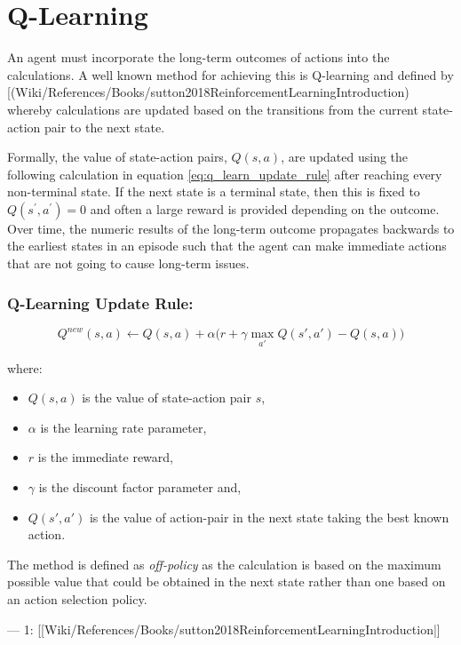 \documentclass{article}
\title{}
\author{Philip Osborne}
\begin{document}
\maketitle
\section{Q-Learning}
\label{loc:q:learning}
An agent must incorporate the long-term outcomes of actions into the calculations. A well known method for achieving this is Q-learning and defined by \cite{sutton2018ReinforcementLearningIntroduction} [\cite{sutton2018ReinforcementLearningIntroduction}(Wiki/References/Books/sutton2018ReinforcementLearningIntroduction) whereby calculations are updated based on the transitions from the current state-action pair to the next state.

Formally, the value of state-action pairs, $Q(s,a)$, are updated using the following calculation in equation \autoref{eq:q_learn_update_rule} after reaching every non-terminal state. If the next state is a terminal state, then this is fixed to $Q(s^\prime,a^\prime)=0$ and often a large reward is provided depending on the outcome. Over time, the numeric results of the long-term outcome propagates backwards to the earliest states in an episode such that the agent can make immediate actions that are not going to cause long-term issues. 
\subsubsection{Q-Learning Update Rule:}
\label{loc:q:learning.q:learning_update_rule:}
\begin{equation}
\label{eq:q_learn_update_rule}
Q^{new}(s,a)\leftarrow Q(s,a) + \alpha {\bigg (} r + \gamma \max_{a'}Q(s',a') - Q(s,a) {\bigg )}
\end{equation}

where:
\begin{itemize}
\item $Q(s,a)$ is the value of state-action pair $s$,
\item $\alpha$ is the learning rate parameter,
\item $r$ is the immediate reward,
\item $\gamma$ is the discount factor parameter and,
\item $Q(s', a')$ is the value of action-pair in the next state taking the best known action.
\end{itemize}

The method is defined as \emph{off-policy} as the calculation is based on the maximum possible value that could be obtained in the next state rather than one based on an action selection policy. 

---
1: [[Wiki/References/Books/sutton2018ReinforcementLearningIntroduction|\cite{sutton2018ReinforcementLearningIntroduction}]
\printbibliography
\end{document}
